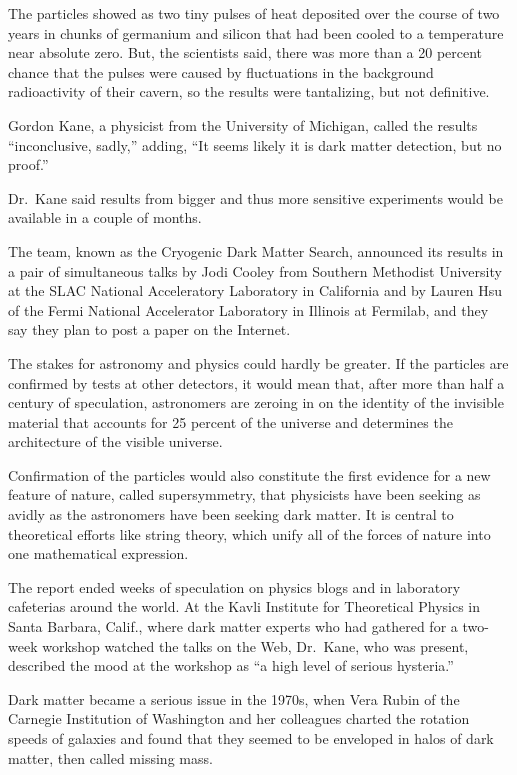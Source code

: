 ﻿\documentclass[12pt]{article}
\begin{document}
The particles showed as two tiny pulses of heat deposited over the course of two years in chunks of
germanium and silicon that had been cooled to a temperature near absolute zero. But, the scientists
said, there was more than a 20 percent chance that the pulses were caused by fluctuations in the
background radioactivity of their cavern, so the results were tantalizing, but not definitive.

Gordon Kane, a physicist from the University of Michigan, called the results ``inconclusive,
sadly,'' adding, ``It seems likely it is dark matter detection, but no proof.''

Dr.~Kane said results from bigger and thus more sensitive experiments would be available in a couple
of months.

The team, known as the Cryogenic Dark Matter Search, announced its results in a pair of simultaneous
talks by Jodi Cooley from Southern Methodist University at the SLAC National Acceleratory Laboratory
in California and by Lauren Hsu of the Fermi National Accelerator Laboratory in Illinois at
Fermilab, and they say they plan to post a paper on the Internet.

The stakes for astronomy and physics could hardly be greater. If the particles are confirmed by
tests at other detectors, it would mean that, after more than half a century of speculation,
astronomers are zeroing in on the identity of the invisible material that accounts for 25 percent of
the universe and determines the architecture of the visible universe.

Confirmation of the particles would also constitute the first evidence for a new feature of nature,
called supersymmetry, that physicists have been seeking as avidly as the astronomers have been
seeking dark matter. It is central to theoretical efforts like string theory, which unify all of the
forces of nature into one mathematical expression.

The report ended weeks of speculation on physics blogs and in laboratory cafeterias around the
world. At the Kavli Institute for Theoretical Physics in Santa Barbara, Calif., where dark matter
experts who had gathered for a two-week workshop watched the talks on the Web, Dr.~Kane, who was
present, described the mood at the workshop as ``a high level of serious hysteria.''

Dark matter became a serious issue in the 1970s, when Vera Rubin of the Carnegie Institution of
Washington and her colleagues charted the rotation speeds of galaxies and found that they seemed to
be enveloped in halos of dark matter, then called missing mass.
\end{document}
